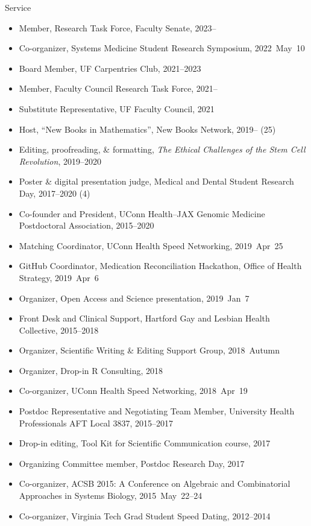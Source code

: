 \documentclass[10pt,a4paper]{article}
\begin{document}
\vspace{.25cm}
{\sc Service}
\begin{itemize}[label=$\circ$,nolistsep]
\item
Member, Research Task Force, Faculty Senate, 2023--
\item
Co-organizer, Systems Medicine Student Research Symposium, 2022~May~10
\item
Board Member, UF Carpentries Club, 2021--2023
\item
Member, Faculty Council Research Task Force, 2021--
\item
Substitute Representative, UF Faculty Council, 2021
\item
Host, ``New Books in Mathematics'', New Books Network, 2019-- (25)
\item
Editing, proofreading, \& formatting, {\itshape The Ethical Challenges of the Stem Cell Revolution}, 2019--2020
\item
Poster \& digital presentation judge, Medical and Dental Student Research Day, 2017--2020 (4)
\item
Co-founder and President, UConn Health--JAX Genomic Medicine Postdoctoral Association, 2015--2020
\item
Matching Coordinator, UConn Health Speed Networking, 2019~Apr~25
\item
GitHub Coordinator, Medication Reconciliation Hackathon, Office of Health Strategy, 2019~Apr~6
\item
Organizer, Open Access and Science presentation, 2019~Jan~7
\item
Front Desk and Clinical Support, Hartford Gay and Lesbian Health Collective, 2015--2018
\item
Organizer, Scientific Writing \& Editing Support Group, 2018~Autumn
\item
Organizer, Drop-in R Consulting, 2018
\item
Co-organizer, UConn Health Speed Networking, 2018~Apr~19
\item
Postdoc Representative and Negotiating Team Member, University Health Professionals AFT Local 3837, 2015--2017
\item
Drop-in editing, Tool Kit for Scientific Communication course, 2017
\item
Organizing Committee member, Postdoc Research Day, 2017
\item
Co-organizer, ACSB 2015: A Conference on Algebraic and Combinatorial Approaches in Systems Biology, 2015~May~22--24
\item
Co-organizer, Virginia Tech Grad Student Speed Dating, 2012--2014

\end{itemize}
\end{document}
